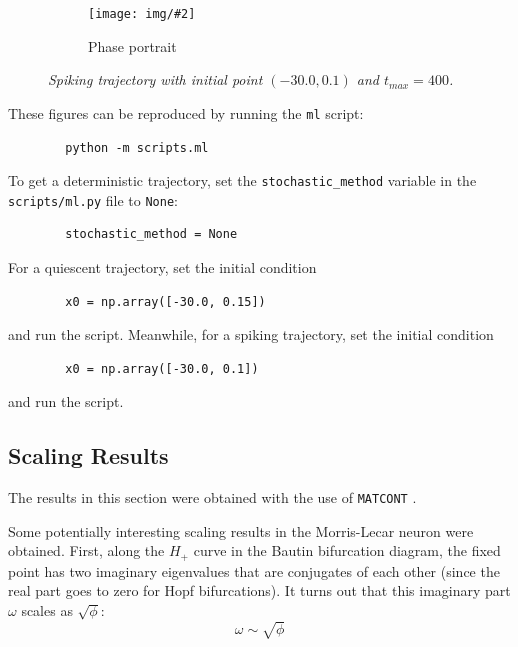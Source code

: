 \documentclass[letterpaper,12pt]{article}
\numberwithin{table}{section}
\numberwithin{figure}{section}
\numberwithin{equation}{section}
\newcommand{\centerfig}[2]{\begin{center}\texttt{[image: img/\#2]}\end{center}}
\newcommand{\ccaption}[1]{\caption{\textit{#1}}}
\begin{document}
\begin{flushleft}
\begin{figure}[!h]
        \begin{subfigure}{\textwidth}
            \centerfig{0.7}{spp.jpg}
            \caption{Phase portrait}
            \label{fig:s-plots-pp}
        \end{subfigure}
    
        \captionsetup{width=0.9\linewidth}
        \ccaption{Spiking trajectory with initial point $(-30.0, 0.1)$ and $t_{max} = 400$.}
        \label{fig:s-plots}
    
    \end{figure}

    These figures can be reproduced by running the \texttt{ml} script:
    \begin{lstlisting}
        python -m scripts.ml
    \end{lstlisting}
    To get a deterministic trajectory, set the \texttt{stochastic\_method} variable in the \texttt{scripts/ml.py} file to \texttt{None}:
    \begin{lstlisting}
        stochastic_method = None
    \end{lstlisting}
    For a quiescent trajectory, set the initial condition
    \begin{lstlisting}
        x0 = np.array([-30.0, 0.15])
    \end{lstlisting}
    and run the script. Meanwhile, for a spiking trajectory, set the initial condition
    \begin{lstlisting}
        x0 = np.array([-30.0, 0.1])
    \end{lstlisting}
    and run the script.

    \subsection{Scaling Results}

    The results in this section were obtained with the use of \texttt{MATCONT} \cite{matcont}.

    Some potentially interesting scaling results in the Morris-Lecar neuron were obtained. First, along the $H_+$ curve in the Bautin bifurcation diagram, the fixed point has two imaginary eigenvalues that are conjugates of each other (since the real part goes to zero for Hopf bifurcations). It turns out that this imaginary part $\omega$ scales as $\sqrt{\phi}$:
    \begin{equation}
        \omega \sim \sqrt{\phi}
    \end{equation}


\end{flushleft}
\end{document}
